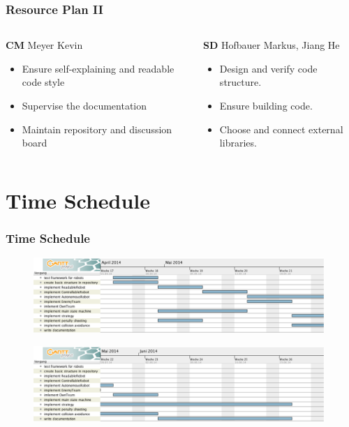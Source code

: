 \documentclass[hyperref={pdfpagelabels=false}]{beamer}
\begin{document}
\begin{frame}
	\frametitle{Resource Plan II}
	\begin{columns}[t]
		\begin{column}{0.50\textwidth}
			\begin{block}{\textbf{CM} Meyer Kevin}
				\begin{itemize}
					\item Ensure self-explaining and readable code style
					\item Supervise the documentation
					\item Maintain repository and discussion board
				\end{itemize}
			\end{block}
		\end{column}
		
		\begin{column}{0.50\textwidth}
			\begin{block}{\textbf{SD} Hofbauer Markus, Jiang He}
				\begin{itemize}
					\item Design and verify code structure.
					\item Ensure building code.
					\item Choose and connect external libraries.
				\end{itemize}
			\end{block}
		\end{column}
	\end{columns}
\end{frame}

\section{Time Schedule} 
\begin{frame}
	\frametitle{Time Schedule} 
	\begin{figure}
		\centering
		\includegraphics[width = 0.98\textwidth]{g1}
	\end{figure}
	\begin{figure}
		\centering
		\includegraphics[width = 0.98\textwidth]{g2}
	\end{figure}
	
\end{frame}
\end{document}

